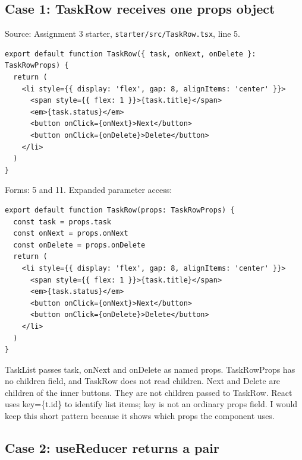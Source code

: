 \documentclass[
  10pt,
  a4paper,
]{article}
\begin{document}
\subsection{Case 1: TaskRow receives one props
object}\label{case-1-taskrow-receives-one-props-object}

Source: Assignment 3 starter,
\texttt{starter/\allowbreak{}src/\allowbreak{}TaskRow.\allowbreak{}tsx},
line 5.

\begin{minipage}{\linewidth}

\begin{lstlisting}
export default function TaskRow({ task, onNext, onDelete }: TaskRowProps) {
  return (
    <li style={{ display: 'flex', gap: 8, alignItems: 'center' }}>
      <span style={{ flex: 1 }}>{task.title}</span>
      <em>{task.status}</em>
      <button onClick={onNext}>Next</button>
      <button onClick={onDelete}>Delete</button>
    </li>
  )
}
\end{lstlisting}

\end{minipage}\par

Forms: 5 and 11. Expanded parameter access:

\begin{minipage}{\linewidth}

\begin{lstlisting}
export default function TaskRow(props: TaskRowProps) {
  const task = props.task
  const onNext = props.onNext
  const onDelete = props.onDelete
  return (
    <li style={{ display: 'flex', gap: 8, alignItems: 'center' }}>
      <span style={{ flex: 1 }}>{task.title}</span>
      <em>{task.status}</em>
      <button onClick={onNext}>Next</button>
      <button onClick={onDelete}>Delete</button>
    </li>
  )
}
\end{lstlisting}

\end{minipage}\par

TaskList passes task, onNext and onDelete as named props. TaskRowProps
has no children field, and TaskRow does not read children. Next and
Delete are children of the inner buttons. They are not children passed
to TaskRow. React uses key=\{t.id\} to identify list items; key is not
an ordinary props field. I would keep this short pattern because it
shows which props the component uses.

\subsection{Case 2: useReducer returns a
pair}\label{case-2-usereducer-returns-a-pair}
\end{document}
